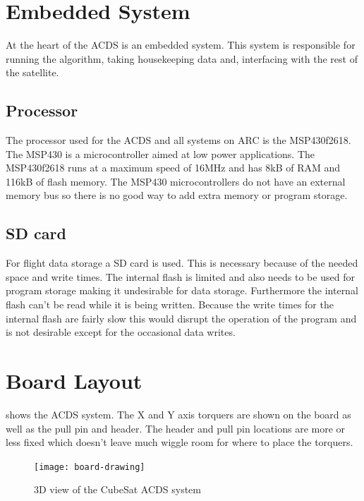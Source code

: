 \section{Embedded System}

At the heart of the \ac{ACDS} is an embedded system. This system is responsible for running the algorithm, taking housekeeping data and, interfacing with the rest of the satellite.

\subsection{Processor}

The processor used for the \ac{ACDS} and all systems on \ac{ARC} is the MSP430f2618. The MSP430 is a microcontroller aimed at low power applications. The MSP430f2618 runs at a maximum speed of 16MHz and has 8kB of RAM and 116kB of flash memory. The MSP430 microcontrollers do not have an external memory bus so there is no good way to add extra memory or program storage. 

\subsection{SD card}

For flight data storage a SD card is used. This is necessary because of the needed space and write times. The internal flash is limited and also needs to be used for program storage making it undesirable for data storage. Furthermore the internal flash can't be read while it is being written. Because the write times for the internal flash are fairly slow this would disrupt the operation of the program and is not desirable except for the occasional data writes.

\section{Board Layout}

 shows the \ac{ACDS} system. The X and Y axis torquers are shown on the board as well as the pull pin and header. The header and pull pin locations are more or less fixed which doesn't leave much wiggle room for where to place the torquers.

\begin{figure}[H]
    \centering
    \texttt{[image: board-drawing]}
    \caption{3D view of the CubeSat \acs{ACDS} system}
    \label{fig:3dview}
\end{figure}

